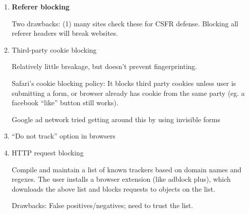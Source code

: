 \begin{enumerate}
	\item \textbf{Referer blocking}

		Two drawbacks: (1) many sites check these for CSFR defense. Blocking all referer headers will break websites.
	\item Third-party cookie blocking

		Relatively little breakage, but doesn't prevent fingerprinting. 

		Safari's cookie blocking policy: It blocks third party cookies unless user is submitting a form, or browser already has cookie from the same party (eg. a facebook ``like'' button still works). 

		Google ad network tried getting around this by using invisible forms
	\item ``Do not track'' option in browsers
	\item HTTP request blocking

		Compile and maintain a list of known trackers based on domain names and regexes. The user installs a browser extension (like adblock plus), which downloads the above list and blocks requests to objects on the list.

		Drawbacks: False positives/negatives; need to trust the list.
\end{enumerate}

